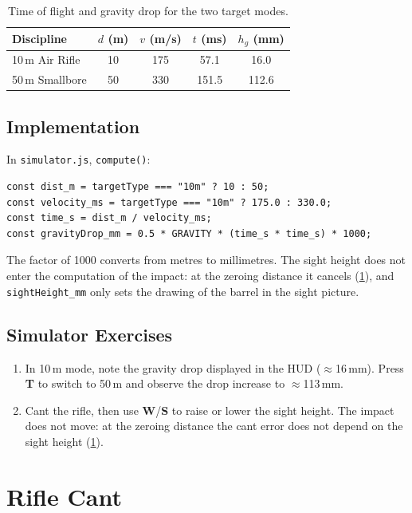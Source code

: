 \documentclass[11pt]{article}
\newcommand{\code}[1]{\texttt{#1}}
\newcommand{\file}[1]{\texttt{#1}}
\newcommand{\key}[1]{\textsf{\textbf{#1}}}
\begin{document}
\begin{table}[H]
\centering\small
\begin{tabular}{@{}lcccc@{}}
\toprule
\textbf{Discipline} & $d$ (m) & $v$ (m/s) & $t$ (ms) & $h_g$ (mm) \\
\midrule
10\,m Air Rifle  & 10 & 175 & 57.1  & 16.0  \\
50\,m Smallbore  & 50 & 330 & 151.5 & 112.6 \\
\bottomrule
\end{tabular}
\caption{Time of flight and gravity drop for the two target modes.}
\label{tab:drop}
\end{table}

\subsection{Implementation}
In \file{simulator.js}, \code{compute()}:
\begin{lstlisting}
const dist_m = targetType === "10m" ? 10 : 50;
const velocity_ms = targetType === "10m" ? 175.0 : 330.0;
const time_s = dist_m / velocity_ms;
const gravityDrop_mm = 0.5 * GRAVITY * (time_s * time_s) * 1000;
\end{lstlisting}
The factor of 1000 converts from metres to millimetres.  The sight
height does not enter the computation of the impact: at the zeroing
distance it cancels (\cref{sec:cant}), and \code{sightHeight\_mm}
only sets the drawing of the barrel in the sight picture.

\subsection{Simulator Exercises}
\begin{enumerate}[nosep]
  \item In 10\,m mode, note the gravity drop displayed in the HUD
        ($\approx$16\,mm).  Press \key{T} to switch to 50\,m and
        observe the drop increase to $\approx$113\,mm.
  \item Cant the rifle, then use \key{W}/\key{S} to raise or lower
        the sight height.  The impact does not move: at the zeroing
        distance the cant error does not depend on the sight height
        (\cref{sec:cant}).
\end{enumerate}


\section{Rifle Cant}\label{sec:cant}
\end{document}
